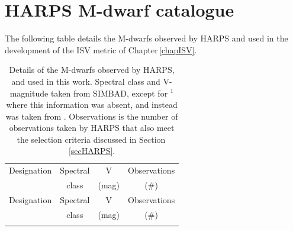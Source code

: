 \appendix
\chapter{HARPS M-dwarf catalogue}
The following table details the M-dwarfs observed by HARPS \citep{2013Bonfils} and used in the development of the ISV metric of Chapter\,\ref{chapISV}.\\
\begin{longtable}[c]{|l|c|c|c|}
    \hline
    Designation & Spectral & V & Observations\\
    & class & (mag) & (\#)\\
    \hline
    \endfirsthead
    
    \hline
    Designation & Spectral & V & Observations\\
    & class & (mag) & (\#)\\
    \hline
    \endhead
    
    \hline
    \endfoot
    
    \hline
    \caption{Details of the M-dwarfs observed by HARPS, and used in this work. Spectral class and V-magnitude taken from SIMBAD, except for $^1$ where this information was absent, and instead was taken from \citealt{2013Bonfils}. Observations is the number of observations taken by HARPS that also meet the selection criteria discussed in Section\,\ref{secHARPS}.}
    \label{tabHARPS}
    \endlastfoot
    

\end{longtable}
